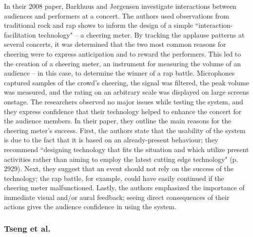 In their 2008 paper, Barkhuus and J{\o}rgensen investigate interactions between audiences and performers at a concert. The authors used observations from traditional rock and rap shows to inform the design of a simple ``interaction-facilitation technology" -- a cheering meter. By tracking the applause patterns at several concerts, it was determined that the two most common reasons for cheering were to express anticipation and to reward the performers. This led to the creation of a cheering meter, an instrument for measuring the volume of an audience -- in this case, to determine the winner of a rap battle. Microphones captured samples of the crowd's cheering, the signal was filtered, the peak volume was measured, and the rating on an arbitrary scale was displayed on large screens onstage. The researchers observed no major issues while testing the system, and they express confidence that their technology helped to enhance the concert for the audience members. In their paper, they outline the main reasons for the cheering meter's success. First, the authors state that the usability of the system is due to the fact that it is based on an already-present behaviour; they recommend ``designing technology that fits the situation and which utilize present activities rather than aiming to employ the latest cutting edge technology" (p. 2929). Next, they suggest that an event should not rely on the success of the technology; the rap battle, for example, could have easily continued if the cheering meter malfunctioned. Lastly, the authors emphasized the importance of immediate visual and/or aural feedback; seeing direct consequences of their actions gives the audience confidence in using the system.

\subsubsection{Tseng et al.}


